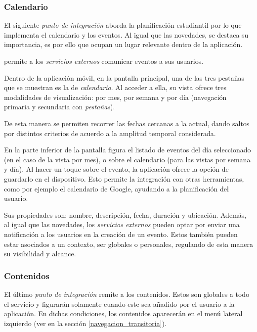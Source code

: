 \subsubsection{Calendario}
\label{funcionalidad_calendario}

El siguiente \textit{punto de integración} aborda la planificación estudiantil por lo que implementa el calendario y los eventos. Al igual que las novedades, se destaca su importancia, es por ello que ocupan un lugar relevante dentro de la aplicación. 

\nombreApp{} permite a los \textit{servicios externos} comunicar eventos a sus usuarios.

Dentro de la aplicación móvil, en la pantalla principal, una de las tres pestañas que se muestran es la de \textit{calendario}. Al acceder a ella, su vista ofrece tres modalidades de visualización: por mes, por semana y por día (navegación primaria y secundaria con \textit{pestañas}). 


De esta manera se permiten recorrer las fechas cercanas a la actual, dando saltos por distintos criterios de acuerdo a la amplitud temporal considerada. 

En la parte inferior de la pantalla figura el listado de eventos del día seleccionado (en el caso de la vista por mes), o sobre el calendario (para las vistas por semana y día). Al hacer un toque sobre el evento, la aplicación ofrece la opción de guardarlo en el dispositivo. Esto permite la integración con otras herramientas, como por ejemplo el calendario de Google, ayudando a la planificación del usuario.

Sus propiedades son: nombre, descripción, fecha, duración y ubicación. Además, al igual que las novedades, los \textit{servicios externos} pueden optar por enviar una notificación a los usuarios en la creación de un evento. Estos también pueden estar asociados a un contexto, ser globales o personales, regulando de esta manera su visibilidad y alcance.

\subsubsection{Contenidos}
\label{funcionalidad_contenidos}

El último \textit{punto de integración} remite a los contenidos. Estos son globales a todo el servicio y figurarán solamente cuando este sea añadido por el usuario a la aplicación. En dichas condiciones, los contenidos aparecerán en el menú lateral izquierdo (ver  en la sección \ref{navegacion_transitoria}).

